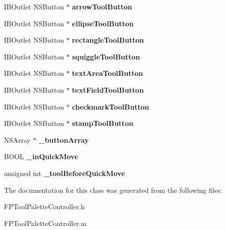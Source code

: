\begin{DoxyCompactItemize}
\item 
\mbox{\label{interface_f_p_tool_palette_controller_a627532e536f3f762ad425bff2de97e20}} 
I\+B\+Outlet N\+S\+Button $\ast$ {\bfseries arrow\+Tool\+Button}
\item 
\mbox{\label{interface_f_p_tool_palette_controller_aad4bdc4a3dd951c52eb7c8f6143949d0}} 
I\+B\+Outlet N\+S\+Button $\ast$ {\bfseries ellipse\+Tool\+Button}
\item 
\mbox{\label{interface_f_p_tool_palette_controller_ac3869b8a3679bcb27d681d288912b3fa}} 
I\+B\+Outlet N\+S\+Button $\ast$ {\bfseries rectangle\+Tool\+Button}
\item 
\mbox{\label{interface_f_p_tool_palette_controller_ac25a153fc10e48dcc5dfceb29720b06f}} 
I\+B\+Outlet N\+S\+Button $\ast$ {\bfseries squiggle\+Tool\+Button}
\item 
\mbox{\label{interface_f_p_tool_palette_controller_afc5770ed3bd18ac4c5bbaff865c8a9ce}} 
I\+B\+Outlet N\+S\+Button $\ast$ {\bfseries text\+Area\+Tool\+Button}
\item 
\mbox{\label{interface_f_p_tool_palette_controller_a2a69ba0428d7a9e698de00c706697e9f}} 
I\+B\+Outlet N\+S\+Button $\ast$ {\bfseries text\+Field\+Tool\+Button}
\item 
\mbox{\label{interface_f_p_tool_palette_controller_addd9097747d28460758d503217fe2d05}} 
I\+B\+Outlet N\+S\+Button $\ast$ {\bfseries checkmark\+Tool\+Button}
\item 
\mbox{\label{interface_f_p_tool_palette_controller_a5ebf91a8062963b99f9bd365b8c17a4a}} 
I\+B\+Outlet N\+S\+Button $\ast$ {\bfseries stamp\+Tool\+Button}
\item 
\mbox{\label{interface_f_p_tool_palette_controller_ae78b1c097a36fe1529cb9e6758659f9e}} 
N\+S\+Array $\ast$ {\bfseries \+\_\+button\+Array}
\item 
\mbox{\label{interface_f_p_tool_palette_controller_aa8bb7fdcabeb3f51be1a97cc5f9e41cd}} 
B\+O\+OL {\bfseries \+\_\+in\+Quick\+Move}
\item 
\mbox{\label{interface_f_p_tool_palette_controller_a462cb1320ffd5e62c268d25e4359e6cf}} 
unsigned int {\bfseries \+\_\+tool\+Before\+Quick\+Move}
\end{DoxyCompactItemize}


The documentation for this class was generated from the following files\+:\begin{DoxyCompactItemize}
\item 
F\+P\+Tool\+Palette\+Controller.\+h\item 
F\+P\+Tool\+Palette\+Controller.\+m\end{DoxyCompactItemize}
